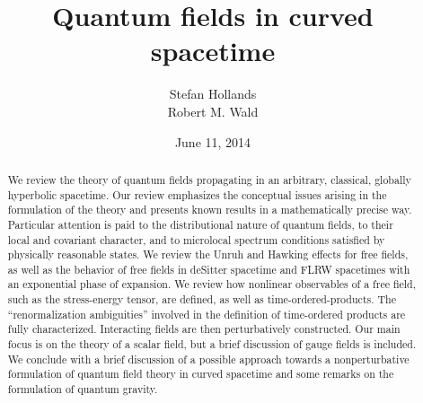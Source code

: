\documentclass[12pt]{article}
\theoremstyle{plain}
\theoremstyle{definition}
\begin{document}
%



\title{Quantum fields in curved spacetime}

\author{Stefan Hollands \\ Robert M. Wald}



\date{June 11, 2014}

\maketitle
\begin{abstract}

We review the theory of quantum fields propagating in an arbitrary, classical, globally hyperbolic spacetime. Our review emphasizes the conceptual issues arising in the formulation of the theory and presents known results in a mathematically precise way. Particular attention is paid to the distributional nature of quantum fields, to their local and covariant character, and to microlocal spectrum conditions satisfied by physically reasonable states. We review the Unruh and Hawking effects for free fields, as well as the behavior of free fields in deSitter spacetime and FLRW spacetimes with an exponential phase of expansion. We review how nonlinear observables of a free field, such as the stress-energy tensor, are defined, as well as time-ordered-products. The ``renormalization ambiguities'' involved in the definition of time-ordered products are fully characterized. Interacting fields are then perturbatively constructed. Our main focus is on the theory of a scalar field, but a brief discussion of gauge fields is included. We conclude with a brief discussion of a possible approach towards a nonperturbative formulation of quantum field theory in curved spacetime and some remarks on the formulation of quantum gravity.


\end{abstract}
\end{document}
